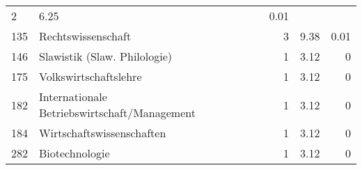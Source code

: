 \begin{longtable}{lXrrr}
       \num{2} &
       \num[round-mode=places,round-precision=2]{6.25} &
         \num[round-mode=places,round-precision=2]{0.01} \\

     135 &
     \multicolumn{1}{X}{ Rechtswissenschaft   } &


       \num{3} &
       \num[round-mode=places,round-precision=2]{9.38} &
         \num[round-mode=places,round-precision=2]{0.01} \\

     146 &
     \multicolumn{1}{X}{ Slawistik (Slaw. Philologie)   } &


       \num{1} &
       \num[round-mode=places,round-precision=2]{3.12} &
         \num[round-mode=places,round-precision=2]{0} \\

     175 &
     \multicolumn{1}{X}{ Volkswirtschaftslehre   } &


       \num{1} &
       \num[round-mode=places,round-precision=2]{3.12} &
         \num[round-mode=places,round-precision=2]{0} \\

     182 &
     \multicolumn{1}{X}{ Internationale Betriebswirtschaft/Management   } &


       \num{1} &
       \num[round-mode=places,round-precision=2]{3.12} &
         \num[round-mode=places,round-precision=2]{0} \\

     184 &
     \multicolumn{1}{X}{ Wirtschaftswissenschaften   } &


       \num{1} &
       \num[round-mode=places,round-precision=2]{3.12} &
         \num[round-mode=places,round-precision=2]{0} \\

     282 &
     \multicolumn{1}{X}{ Biotechnologie   } &


       \num{1} &
       \num[round-mode=places,round-precision=2]{3.12} &
         \num[round-mode=places,round-precision=2]{0} \\


\end{longtable}
